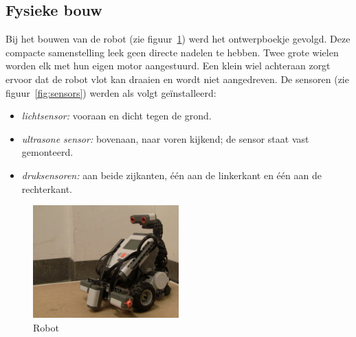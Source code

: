 \documentclass[eind]{penoverslag}
\begin{document}
\subsection{Fysieke bouw} %
\label{ssec:fysbouw}
Bij het bouwen van de robot (zie figuur~\ref{robot}) werd het ontwerpboekje gevolgd. Deze compacte samenstelling leek geen directe nadelen te hebben. Twee grote wielen worden elk met hun eigen motor aangestuurd. Een klein wiel achteraan zorgt ervoor dat de robot vlot kan draaien en wordt niet aangedreven. De sensoren (zie figuur~\ref{fig:sensors}) werden als volgt ge\"installeerd: 

\begin{itemize}
\item \textit{lichtsensor:} vooraan en dicht tegen de grond.
\item \textit{ultrasone sensor:} bovenaan, naar voren kijkend; de sensor staat vast gemonteerd.
\item \textit{druksensoren:} aan beide zijkanten, \'e\'en aan de linkerkant en \'e\'en aan de rechterkant.
\end{itemize}

\begin{figure}[tbp]
\begin{center}
    \includegraphics[width=0.5\textwidth]{robot}
    \caption{Robot}
    \label{robot}
\end{center}
\end{figure}
\end{document}
